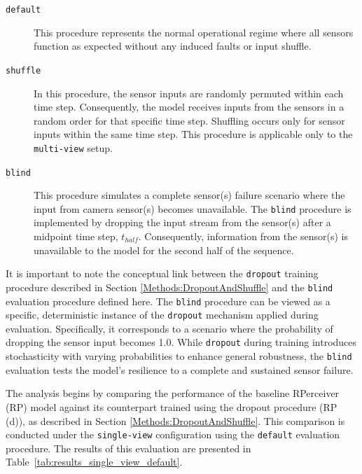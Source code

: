 \begin{description}
    \item[\texttt{default}] This procedure represents the normal operational regime where all sensors function as expected without any induced faults or input shuffle.

    \item[\texttt{shuffle}] In this procedure, the sensor inputs are randomly permuted within each time step. Consequently, the model receives inputs from the sensors in a random order for that specific time step. Shuffling occurs only for sensor inputs within the same time step. This procedure is applicable only to the \texttt{multi-view} setup.

    \item[\texttt{blind}] This procedure simulates a complete sensor(s) failure scenario where the input from camera sensor(s) becomes unavailable. The \texttt{blind} procedure is implemented by dropping the input stream from the sensor(s) after a midpoint time step, $t_{half}$. Consequently, information from the sensor(s) is unavailable to the model for the second half of the sequence.
\end{description}

It is important to note the conceptual link between the \texttt{dropout} training procedure described in Section \ref{Methods:DropoutAndShuffle} and the \texttt{blind} evaluation procedure defined here. The \texttt{blind} procedure can be viewed as a specific, deterministic instance of the \texttt{dropout} mechanism applied during evaluation. Specifically, it corresponds to a scenario where the probability of dropping the sensor input becomes 1.0. While \texttt{dropout} during training introduces stochasticity with varying probabilities to enhance general robustness, the \texttt{blind} evaluation tests the model's resilience to a complete and sustained sensor failure.

The analysis begins by comparing the performance of the baseline RPerceiver (RP) model against its counterpart trained using the dropout procedure (RP (d)), as described in Section \ref{Methods:DropoutAndShuffle}. This comparison is conducted under the \texttt{single-view} configuration using the \texttt{default} evaluation procedure. The results of this evaluation are presented in Table~\ref{tab:results_single_view_default}.

